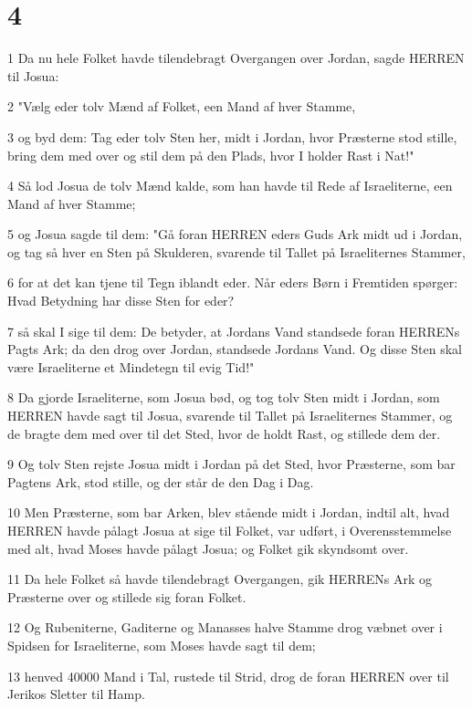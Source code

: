 \chapter{4}

\par 1 Da nu hele Folket havde tilendebragt Overgangen over Jordan, sagde HERREN til Josua:
\par 2 "Vælg eder tolv Mænd af Folket, een Mand af hver Stamme,
\par 3 og byd dem: Tag eder tolv Sten her, midt i Jordan, hvor Præsterne stod stille, bring dem med over og stil dem på den Plads, hvor I holder Rast i Nat!"
\par 4 Så lod Josua de tolv Mænd kalde, som han havde til Rede af Israeliterne, een Mand af hver Stamme;
\par 5 og Josua sagde til dem: "Gå foran HERREN eders Guds Ark midt ud i Jordan, og tag så hver en Sten på Skulderen, svarende til Tallet på Israeliternes Stammer,
\par 6 for at det kan tjene til Tegn iblandt eder. Når eders Børn i Fremtiden spørger: Hvad Betydning har disse Sten for eder?
\par 7 så skal I sige til dem: De betyder, at Jordans Vand standsede foran HERRENs Pagts Ark; da den drog over Jordan, standsede Jordans Vand. Og disse Sten skal være Israeliterne et Mindetegn til evig Tid!"
\par 8 Da gjorde Israeliterne, som Josua bød, og tog tolv Sten midt i Jordan, som HERREN havde sagt til Josua, svarende til Tallet på Israeliternes Stammer, og de bragte dem med over til det Sted, hvor de holdt Rast, og stillede dem der.
\par 9 Og tolv Sten rejste Josua midt i Jordan på det Sted, hvor Præsterne, som bar Pagtens Ark, stod stille, og der står de den Dag i Dag.
\par 10 Men Præsterne, som bar Arken, blev stående midt i Jordan, indtil alt, hvad HERREN havde pålagt Josua at sige til Folket, var udført, i Overensstemmelse med alt, hvad Moses havde pålagt Josua; og Folket gik skyndsomt over.
\par 11 Da hele Folket så havde tilendebragt Overgangen, gik HERRENs Ark og Præsterne over og stillede sig foran Folket.
\par 12 Og Rubeniterne, Gaditerne og Manasses halve Stamme drog væbnet over i Spidsen for Israeliterne, som Moses havde sagt til dem;
\par 13 henved 40000 Mand i Tal, rustede til Strid, drog de foran HERREN over til Jerikos Sletter til Hamp.

